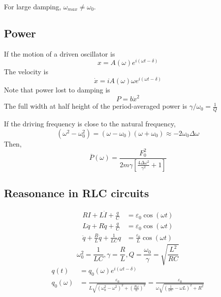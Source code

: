 \documentclass[a4paper]{article}
\numberwithin{equation}{section}
\begin{document}
For large damping, $\omega_{max}\neq\omega_0$.

\subsection{Power}

If the motion of a driven oscillator is
\begin{equation}
    x=A(\omega)e^{i(\omega t-\delta)}
\end{equation}
The velocity is 
\begin{equation}
    \dot x=iA(\omega)\omega e^{i(\omega t-\delta)}
\end{equation}
Note that power lost to damping is 
\begin{equation}
    P=b\dot x^2
\end{equation}
The full width at half height of the period-averaged power is $\gamma/\omega_0=\frac{1}{Q}$
\begin{center}
\end{center}

If the driving frequency is close to the natural frequency, 
\begin{equation}
    (\omega^2-\omega_0^2)=(\omega-\omega_0)(\omega+\omega_0)\approx -2\omega_0\Delta\omega
\end{equation}
Then, 
\begin{equation}
    \overline P(\omega)=\frac{F_0^2}{2m\gamma[\frac{4\Delta\omega^2}{\gamma^2}+1]}
\end{equation}
\subsection{Reasonance in RLC circuits}
\begin{align}
    RI+L\dot I+\frac{q}{C}&=\varepsilon_0\cos(\omega t)\\
    L\ddot q+R\dot q+\frac{q}{C}&=\varepsilon_0\cos(\omega t)\\
    \ddot q+\frac{R}{L}\dot q+\frac{1}{LC}q&=\frac{\varepsilon_0}{L}\cos(\omega t)
\end{align}
$$\omega_0^2=\frac{1}{LC},\gamma=\frac{R}{L},Q=\frac{\omega_0}{\gamma}=\sqrt{\frac{L^2}{RC}}$$
\begin{align}
    q(t)&=q_0(\omega)e^{i(\omega t-\delta)}\\
    q_0(\omega)&=\frac{\varepsilon_0}{L\sqrt{(\omega_0^2-\omega^2)^2+\left(\frac{R\omega}{L}\right)^2}}=\frac{\varepsilon_0}{\omega\sqrt{\left(\frac{1}{\omega C}-\omega L\right)^2+R^2}}
\end{align}
\end{document}
